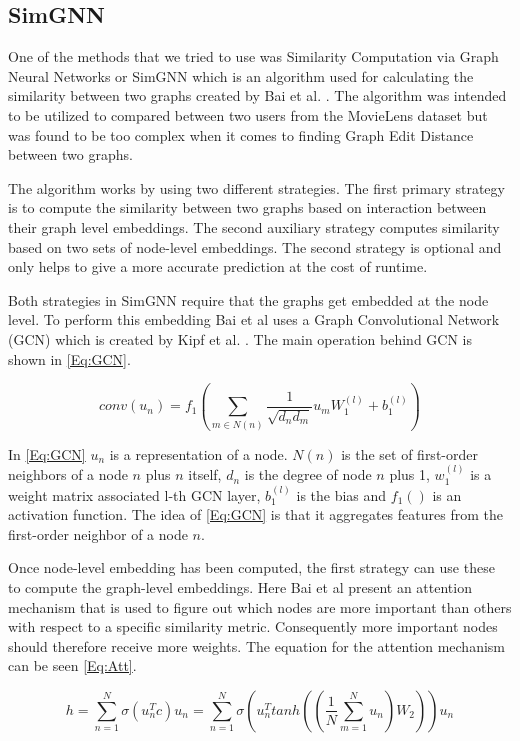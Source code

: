 \subsection{SimGNN}\label{AP:SimGNN}
One of the methods that we tried to use was Similarity Computation via Graph Neural Networks or SimGNN which is an algorithm used for calculating the similarity between two graphs created by Bai et al. \cite{Bai2018}. The algorithm was intended to be utilized to compared between two users from the MovieLens dataset but was found to be too complex when it comes to finding Graph Edit Distance between two graphs. 

The algorithm works by using two different strategies. The first primary strategy is to compute the similarity between two graphs based on interaction between their graph level embeddings. The second auxiliary strategy computes similarity based on two sets of node-level embeddings. The second strategy is optional and only helps to give a more accurate prediction at the cost of runtime\cite{Bai2018}.

Both strategies in SimGNN require that the graphs get embedded at the node level. To perform this embedding Bai et al uses a Graph Convolutional Network (GCN)\cite{Bai2018} which is created by Kipf et al. \cite{Kipf2016}. The main operation behind GCN is shown in \autoref{Eq:GCN}.


\begin{equation}\label{Eq:GCN}
conv(u_n)=f_1(\sum_{m \in N(n)} \frac{1}{\sqrt{d_nd_m}}u_mW_1^{(l)}+b_1^{(l)})
\end{equation}

In \autoref{Eq:GCN} $u_n$ is a representation of a node. $N(n)$ is the set of first-order neighbors of a node $n$ plus $n$ itself, $d_n$ is the degree of node $n$ plus 1, $w_1^{(l)}$ is a weight matrix associated l-th GCN layer, $b_1^{(l)}$ is the bias and $f_1()$ is an activation function. The idea of \autoref{Eq:GCN} is that it aggregates features from the first-order neighbor of a node $n$\cite{Bai2018}.


Once node-level embedding has been computed, the first strategy can use these to compute the graph-level embeddings. Here Bai et al present an attention mechanism that is used to figure out which nodes are more important than others with respect to a specific similarity metric. Consequently more important nodes should therefore receive more weights\cite{Bai2018}. The equation for the attention mechanism can be seen \autoref{Eq:Att}.


\begin{equation}\label{Eq:Att}
h= \sum^N_{n=1} \sigma(u^T_nc)u_n=\sum^N_{n=1}\sigma(u^T_ntanh((\frac{1}{N}\sum_{m=1}^Nu_n)W_2))u_n
\end{equation}

